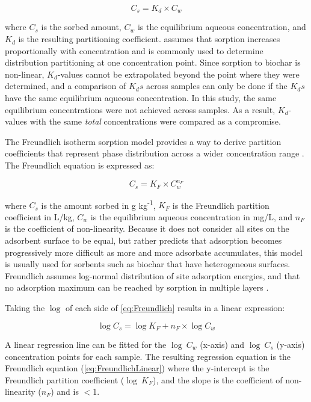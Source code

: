 \begin{equation}\label{eq:linear}
C_s = K_d \times C_w
\end{equation}

where $C_s$ is the sorbed amount, $C_w$ is the equilibrium aqueous concentration, and $K_d$ is the resulting partitioning coefficient.  assumes that sorption increases proportionally with concentration and is commonly used to determine distribution partitioning at one concentration point. Since sorption to biochar is non-linear, $K_d$-values cannot be extrapolated beyond the point where they were determined, and a comparison of $K_ds$ across samples can only be done if the $K_ds$ have the same equilibrium aqueous concentration. In this study, the same equilibrium concentrations were not achieved across samples. As a result, $K_d$-values with the same \textit{total} concentrations were compared as a compromise. 

The Freundlich isotherm sorption model provides a way to derive partition coefficients that represent phase distribution across a wider concentration range \citep{zhang2013sorption}. The Freundlich equation is expressed as:

\begin{equation} \label{eq:Freundlich}
    C_s = K_F \times C_{w}^{n_F}
\end{equation}

where $C_s$ is the amount sorbed in \textmu g kg\textsuperscript{-1}, $K_F$ is the Freundlich partition coefficient in L/kg, $C_{w}$ is the equilibrium aqueous concentration in mg/L, and $n_F$ is the coefficient of non-linearity. Because it does not consider all sites on the adsorbent surface to be equal, but rather predicts that adsorption becomes progressively more difficult as more and more adsorbate accumulates, this model is usually used for sorbents such as biochar that have heterogeneous surfaces\citep{yin2022insights}. Freundlich assumes log-normal distribution of site adsorption energies, and that no adsorption maximum can be reached by sorption in multiple layers \citep{schwarzenbach2005environmental}.

Taking the $\log$ of each side of \cref{eq:Freundlich} results in a linear expression:

\begin{equation} \label{eq:FreundlichLinear}
    \log C_s = \log K_F + n_F \times \log C_{w}
\end{equation}

A linear regression line can be fitted for the $\log~C_w$ (x-axis) and $\log~C_s$ (y-axis) concentration points for each sample. The resulting regression equation is the Freundlich equation (\cref{eq:FreundlichLinear}) where the y-intercept is the Freundlich partition coefficient ($\log~K_F$), and the slope is the coefficient of non-linearity ($n_F$) and is $<$1. 

